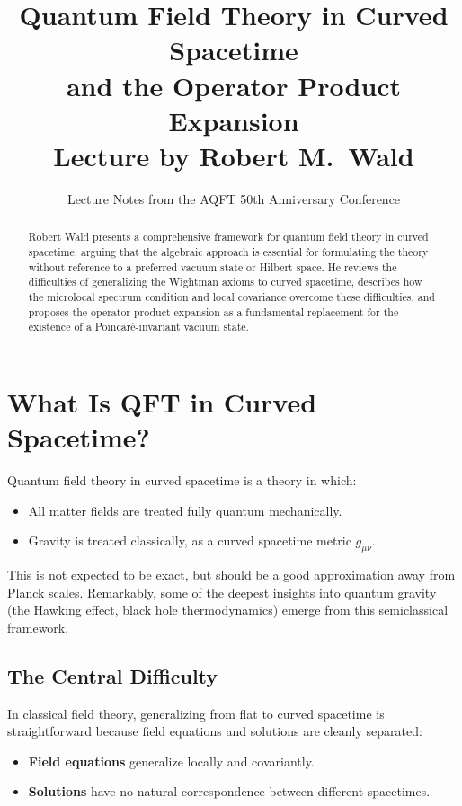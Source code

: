 \documentclass[11pt,a4paper]{article}
\title{\textbf{Quantum Field Theory in Curved Spacetime\\and the Operator Product Expansion}\\[6pt]
\large Lecture by Robert M.\ Wald}
\author{Lecture Notes from the AQFT 50th Anniversary Conference}
\date{}
\begin{document}
\maketitle

\begin{abstract}
Robert Wald presents a comprehensive framework for quantum field theory in curved
spacetime, arguing that the algebraic approach is essential for formulating the theory
without reference to a preferred vacuum state or Hilbert space. He reviews the
difficulties of generalizing the Wightman axioms to curved spacetime, describes
how the microlocal spectrum condition and local covariance overcome these difficulties,
and proposes the operator product expansion as a fundamental replacement for the
existence of a Poincar\'e-invariant vacuum state.
\end{abstract}

\tableofcontents

\section{What Is QFT in Curved Spacetime?}

Quantum field theory in curved spacetime is a theory in which:
\begin{itemize}[nosep]
  \item All matter fields are treated fully quantum mechanically.
  \item Gravity is treated classically, as a curved spacetime metric $g_{\mu\nu}$.
\end{itemize}

This is not expected to be exact, but should be a good approximation away
from Planck scales. Remarkably, some of the deepest insights into quantum
gravity (the Hawking effect, black hole thermodynamics) emerge from this
semiclassical framework.

\subsection{The Central Difficulty}

In classical field theory, generalizing from flat to curved spacetime is
straightforward because field equations and solutions are cleanly separated:
\begin{itemize}[nosep]
  \item \textbf{Field equations} generalize locally and covariantly.
  \item \textbf{Solutions} have no natural correspondence between different spacetimes.
\end{itemize}
\end{document}
